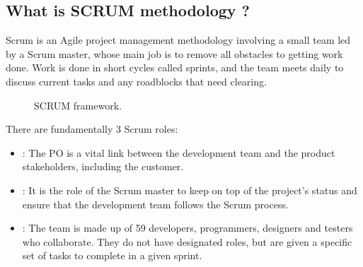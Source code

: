 \documentclass[letterpaper,10pt,english]{jupyterBook}
\begin{document}
\subsection{What is SCRUM methodology ?}
\label{\detokenize{Introduction/introduction:what-is-scrum-methodology}}
\sphinxAtStartPar
Scrum is an Agile project management methodology involving a small team led by a Scrum master, whose main job is to remove all obstacles to getting work done. Work is done in short cycles called sprints, and the team meets daily to discuss current tasks and any roadblocks that need clearing.

\begin{figure}[htbp]
\centering
\capstart

\noindent{}
\caption{SCRUM framework.}\label{\detokenize{Introduction/introduction:scrum-fig}}\end{figure}

\sphinxAtStartPar
There are fundamentally 3 Scrum roles:
\begin{itemize}
\item {} 
\sphinxAtStartPar
{} : The PO is a vital link between the development team and the product stakeholders, including the customer.

\item {} 
\sphinxAtStartPar
{}: It is the role of the Scrum master to keep on top of the project’s status and ensure that the development team follows the Scrum process.

\item {} 
\sphinxAtStartPar
{}: The team is made up of 5\sphinxhyphen{}9 developers, programmers, designers and testers who collaborate. They do not have designated roles, but are given a specific set of tasks to complete in a given sprint.

\end{itemize}
\end{document}
